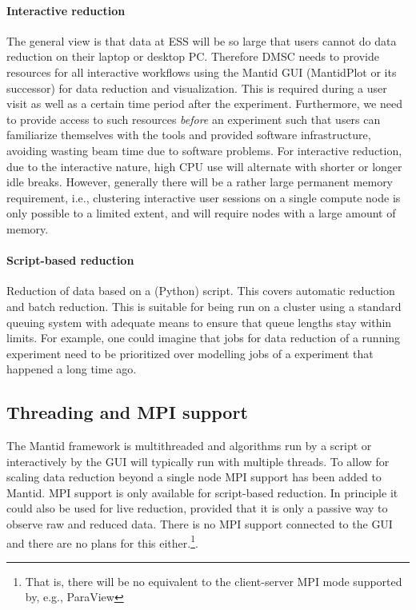 \documentclass[a4paper,english,numbers=noenddot,bibliography=totoc,chapterprefix=on,DIV=12]{scrartcl}
\begin{document}
\paragraph{Interactive reduction} 
The general view is that data at ESS will be so large that users cannot do data reduction on their laptop or desktop PC. Therefore DMSC needs to provide resources for all interactive workflows using the Mantid GUI (MantidPlot or its successor) for data reduction and visualization.
This is required during a user visit as well as a certain time period after the experiment.
Furthermore, we need to provide access to such resources \emph{before} an experiment such that users can familiarize themselves with the tools and provided software infrastructure, avoiding wasting beam time due to software problems.
For interactive reduction, due to the interactive nature, high CPU use will alternate with shorter or longer idle breaks.
However, generally there will be a rather large permanent memory requirement, i.e., clustering interactive user sessions on a single compute node is only possible to a limited extent, and will require nodes with a large amount of memory.

\paragraph{Script-based reduction}
Reduction of data based on a (Python) script.
This covers automatic reduction and batch reduction.
This is suitable for being run on a cluster using a standard queuing system with adequate means to ensure that queue lengths stay within limits.
For example, one could imagine that jobs for data reduction of a running experiment need to be prioritized over modelling jobs of a experiment that happened a long time ago.

\subsection{Threading and MPI support}

The Mantid framework is multithreaded and algorithms run by a script or interactively by the GUI will typically run with multiple threads.
To allow for scaling data reduction beyond a single node MPI support has been added to Mantid.
MPI support is only available for script-based reduction.
In principle it could also be used for live reduction, provided that it is only a passive way to observe raw and reduced data.
There is no MPI support connected to the GUI and there are no plans for this either.\footnote{That is, there will be no equivalent to the client-server MPI mode supported by, e.g., ParaView}.
\end{document}
